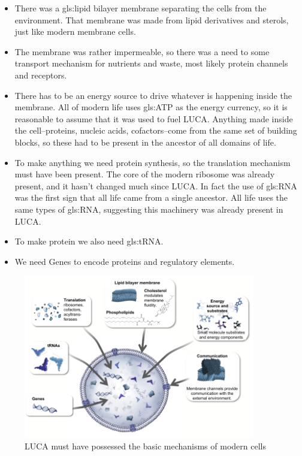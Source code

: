 \documentclass[]{article}
\begin{document}
\begin{itemize}
	\item There was a \gls{gls:lipid} bilayer membrane separating the cells from the environment. That membrane was made from lipid derivatives and sterols, just like modern membrane cells.
	\item The membrane was rather impermeable, so there was a need to some transport mechanism for nutrients and waste, most likely protein channels and receptors.
	\item There has to be an energy source to drive whatever is happening inside the membrane. All of modern life uses \gls{gls:ATP} as the energy currency, so it is reasonable to assume that it was used to fuel LUCA. Anything made inside the cell--proteins, nucleic acids, cofactors--come from the same set of building blocks, so these had to be present in the ancestor of all domains of life.
	\item To make anything we need protein synthesis, so the translation mechanism must have been present. The core of the modern ribosome was already present, and it hasn't changed much since LUCA. In fact the use of \gls{gls:RNA} was the first sign that all life came from a single ancestor. All life uses the same types of \gls{gls:RNA}, suggesting this machinery was already present in LUCA.
	\item To make protein we also need \gls{gls:tRNA}.
	\item We need Genes to encode proteins and regulatory elements.
\end{itemize}

\begin{figure}[H]
	\caption{LUCA must have possessed the basic mechanisms of  modern cells}\label{fig:LUCA_Attributes}
	\includegraphics[width=0.9\textwidth]{LUCA_Attributes}
\end{figure}
\end{document}
